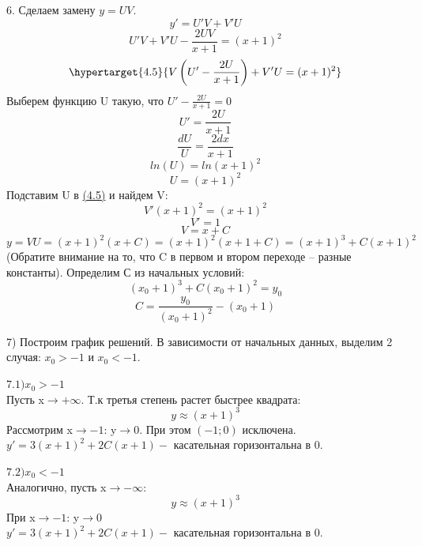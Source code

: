 \documentclass[10pt]{report}
\begin{document}
6. Сделаем замену $y = UV$. \\
\[ y' = U'V+V'U\]
\[  U'V+V'U - \frac {2UV} {x+1} = (x+1)^2\]
\begin{equation}
\hypertarget{4.5} {V\left(U'-\frac {2U}{x+1}\right)+V'U = (x+1)^2}
\end{equation}
Выберем функцию U такую, что $ U'-\frac {2U} {x+1} = 0$
\[ U'=\frac {2U} {x+1}\]
\[ \frac {dU} {U} = \frac {2dx} {x+1}\]
\[ ln(U) = ln(x+1)^2\]
\[U=(x+1)^2\]
Подставим U в  \hyperlink{4.5}{(4.5)} и найдем V:
\[V'(x+1)^2=(x+1)^2\]
\[ V' = 1\] 
\[ V = x+C\]
\[y = VU = (x+1)^2(x+C)= (x+1)^2(x+1+C) = (x+1)^3+C(x+1)^2\]
(Обратите внимание на то, что C в первом и втором переходе -- разные константы). Определим С из начальных условий:
\[(x_0+1)^3+C(x_0+1)^2=y_0\]
\[C = \frac {y_0} {(x_0+1)^2} - (x_0+1)\]

7) Построим график решений. В зависимости от начальных данных, выделим 2 случая: $x_0 > -1$ и $x_0 < -1$.

$7.1) x_0 > -1$\\
Пусть x$\rightarrow +\infty$. Т.к третья степень растет быстрее квадрата:
\[ y \approx (x+1)^3\]
Рассмотрим x$\rightarrow -1$: y$\rightarrow 0$. При этом $(-1;0)$ исключена.\\
$y' = 3(x+1)^2+2C(x+1)- $ касательная горизонтальна в 0.

$7.2) x_0 < -1$\\
Аналогично, пусть x$\rightarrow -\infty$:
\[ y \approx (x+1)^3\]
При x$\rightarrow -1$: y$\rightarrow 0$\\
$y' = 3(x+1)^2+2C(x+1)- $ касательная горизонтальна в 0.
\end{document}
